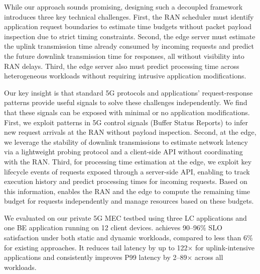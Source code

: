 While our approach sounds promising, designing such a decoupled framework introduces three key technical challenges.
First, the RAN scheduler must identify application request boundaries to estimate time budgets without packet payload inspection due to strict timing constraints.
Second, the edge server must estimate the uplink transmission time already consumed by incoming requests and predict the future downlink transmission time for responses, all without visibility into RAN delays.
Third, the edge server also must predict processing time across heterogeneous workloads without requiring intrusive application modifications.

Our key insight is that standard 5G protocols and applications' request-response patterns provide useful signals to solve these challenges independently.
We find that these signals can be exposed with minimal or no application modifications.
First, we exploit patterns in 5G control signals (\eg Buffer Status Reports) to infer new request arrivals at the RAN without payload inspection.
Second, at the edge, we leverage the stability of downlink transmissions to estimate network latency via a lightweight probing protocol and a client-side API without coordinating with the RAN.
Third, for processing time estimation at the edge, we exploit key lifecycle events of requests exposed through a server-side API, enabling \sys{} to track execution history and predict processing times for incoming requests.
Based on this information, \sys{} enables the RAN and the edge to compute the remaining time budget for requests independently and manage resources based on these budgets.    


We evaluated \sys{} on our private 5G MEC testbed using three LC applications and one BE application running on 12 client devices.
\sys{} achieves 90--96\% SLO satisfaction under both static and dynamic workloads, compared to less than 6\% for existing approaches.
It reduces tail latency by up to 122$\times$ for uplink-intensive applications and consistently improves P99 latency by 2--89$\times$ across all workloads.
